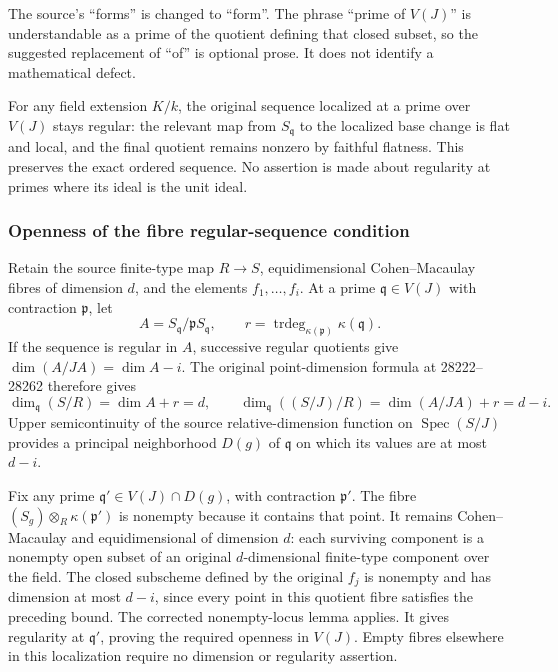 The source's ``forms'' is changed to ``form''. The phrase ``prime of \(V(J)\)'' is understandable as a prime of the quotient defining that closed subset, so the suggested replacement of ``of'' is optional prose. It does not identify a mathematical defect.

For any field extension \(K/k\), the original sequence localized at a prime over \(V(J)\) stays regular: the relevant map from \(S_{\mathfrak q}\) to the localized base change is flat and local, and the final quotient remains nonzero by faithful flatness. This preserves the exact ordered sequence. No assertion is made about regularity at primes where its ideal is the unit ideal.

\subsubsection{Openness of the fibre regular-sequence condition}\label{algebra-proof-039-openness-of-the-fibre-regular-sequence-condition}

Retain the source finite-type map \(R\to S\), equidimensional Cohen--Macaulay fibres of dimension \(d\), and the elements \(f_1,\ldots,f_i\). At a prime \(\mathfrak q\in V(J)\) with contraction \(\mathfrak p\), let \[
A=S_{\mathfrak q}/\mathfrak pS_{\mathfrak q},\qquad
r=\operatorname{trdeg}_{\kappa(\mathfrak p)}\kappa(\mathfrak q).
\] If the sequence is regular in \(A\), successive regular quotients give \(\dim(A/JA)=\dim A-i\). The original point-dimension formula at 28222--28262 therefore gives \[
\dim_{\mathfrak q}(S/R)=\dim A+r=d,\qquad
\dim_{\mathfrak q}((S/J)/R)=\dim(A/JA)+r=d-i.
\] Upper semicontinuity of the source relative-dimension function on \(\operatorname{Spec}(S/J)\) provides a principal neighborhood \(D(g)\) of \(\mathfrak q\) on which its values are at most \(d-i\).

Fix any prime \(\mathfrak q'\in V(J)\cap D(g)\), with contraction \(\mathfrak p'\). The fibre \((S_g)\otimes_R\kappa(\mathfrak p')\) is nonempty because it contains that point. It remains Cohen--Macaulay and equidimensional of dimension \(d\): each surviving component is a nonempty open subset of an original \(d\)-dimensional finite-type component over the field. The closed subscheme defined by the original \(f_j\) is nonempty and has dimension at most \(d-i\), since every point in this quotient fibre satisfies the preceding bound. The corrected nonempty-locus lemma applies. It gives regularity at \(\mathfrak q'\), proving the required openness in \(V(J)\). Empty fibres elsewhere in this localization require no dimension or regularity assertion.

